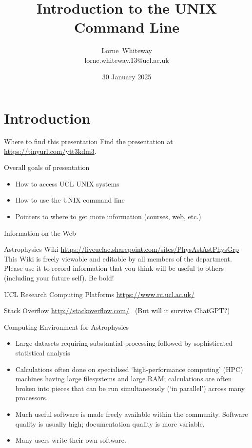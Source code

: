 \documentclass{beamer}
\title{Introduction to the UNIX Command Line}
\author{Lorne~Whiteway \\ lorne.whiteway.13@ucl.ac.uk}
\institute[UCL]
{
  Astrophysics Group\\
  Department of Physics and Astronomy\\
  University College London
}
\date
{30 January 2025}
\begin{document}
\frame{\titlepage}

\section{Introduction}

\begin{frame}{Where to find this presentation}
    Find the presentation at \alert{\url{https://tinyurl.com/ytt3kdm3}}.\\
\end{frame}


\begin{frame}{Overall goals of presentation}
  \begin{itemize}
    \item How to access UCL UNIX systems
    \item How to use the UNIX command line
    \item Pointers to where to get more information (courses, web, etc.)
  \end{itemize}
\end{frame}


\begin{frame}{Information on the Web}
  \begin{block}{Astrophysics Wiki}
    \url{https://liveuclac.sharepoint.com/sites/PhysAstAstPhysGrp}
    This Wiki is freely viewable and editable by all members of the department. Please use it to record information that you think will be useful to others (including your future self). Be bold!
  \end{block}


  \begin{block}{UCL Research Computing Platforms}
    \url{https://www.rc.ucl.ac.uk/}
  \end{block}

  
  \begin{block}{Stack Overflow}
    \url{http://stackoverflow.com/}  \ (But will it survive ChatGPT?)
  \end{block}
  
\end{frame}

\begin{frame}{Computing Environment for Astrophysics}
  \begin{itemize}
  \item Large datasets requiring substantial processing followed by sophisticated statistical analysis
  \item Calculations often done on specialised `high-performance computing' (HPC) machines having large filesystems and large RAM; calculations are often broken into pieces that can be run simultaneously (`in parallel') across many processors.
  \item Much useful software is made freely available within the community. Software quality is usually high; documentation quality is more variable.
  \item Many users write their own software.
  \end{itemize}
\end{frame}
\end{document}
